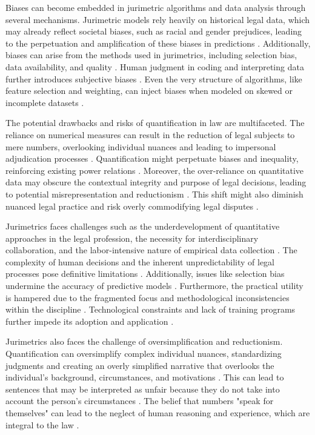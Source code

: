 Biases can become embedded in jurimetric algorithms and data analysis through several mechanisms. Jurimetric models rely heavily on historical legal data, which may already reflect societal biases, such as racial and gender prejudices, leading to the perpetuation and amplification of these biases in predictions \cite{gillborn2017, maia2019, saltelli2020}. Additionally, biases can arise from the methods used in jurimetrics, including selection bias, data availability, and quality \cite{ribeiro1998, ribeiro2021, silva2023}. Human judgment in coding and interpreting data further introduces subjective biases \cite{de2010, zabala1809}. Even the very structure of algorithms, like feature selection and weighting, can inject biases when modeled on skewed or incomplete datasets \cite{ribeiro2021, silva2023}.

The potential drawbacks and risks of quantification in law are multifaceted. The reliance on numerical measures can result in the reduction of legal subjects to mere numbers, overlooking individual nuances and leading to impersonal adjudication processes \cite{lynch2019_pages_1-2}. Quantification might perpetuate biases and inequality, reinforcing existing power relations \cite{lynch2019_pages_6-7}. Moreover, the over-reliance on quantitative data may obscure the contextual integrity and purpose of legal decisions, leading to potential misrepresentation and reductionism \cite{sareen2020_pages_2-2, nunes2018_pages_121-122}. This shift might also diminish nuanced legal practice and risk overly commodifying legal disputes \cite{ribeiro2021_pages_11-12}.

Jurimetrics faces challenges such as the underdevelopment of quantitative approaches in the legal profession, the necessity for interdisciplinary collaboration, and the labor-intensive nature of empirical data collection \cite{de2010, nunes2018_89-90, ribeiro1998_5-6}. The complexity of human decisions and the inherent unpredictability of legal processes pose definitive limitations \cite{nunes2018_133-134, loevinger1949_3-4}. Additionally, issues like selection bias undermine the accuracy of predictive models \cite{ribeiro1998_5-6}. Furthermore, the practical utility is hampered due to the fragmented focus and methodological inconsistencies within the discipline \cite{nunes2018_72-72, loevinger1949_30-31}. Technological constraints and lack of training programs further impede its adoption and application \cite{colombo2017, nunes2018_87-89}.

Jurimetrics also faces the challenge of oversimplification and reductionism. Quantification can oversimplify complex individual nuances, standardizing judgments and creating an overly simplified narrative that overlooks the individual's background, circumstances, and motivations \cite{10.1007/s11186-021-09453-1,10.1057/s41599-020-00557-0}. This can lead to sentences that may be interpreted as unfair because they do not take into account the person's circumstances \cite{10.1590/data.2022.65.3.267,10.32586/rcda.v18i1.585}. The belief that numbers "speak for themselves" can lead to the neglect of human reasoning and experience, which are integral to the law \cite{10.1590/data.2022.65.3.267,10.32586/rcda.v18i1.585}.

